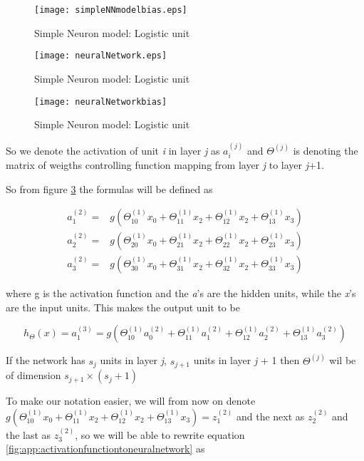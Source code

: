 \begin{figure}[H]
  \centering
  \texttt{[image: simpleNNmodelbias.eps]}
  \caption{Simple Neuron model: Logistic unit}\label{fig:app:simpleNNmodelbias}
\end{figure}

\begin{figure}[H]
  \centering
  \texttt{[image: neuralNetwork.eps]}
  \caption{Simple Neuron model: Logistic unit}\label{fig:app:neuralNetwork}
\end{figure}

\begin{figure}[H]
  \centering
  \texttt{[image: neuralNetworkbias]}
  \caption{Simple Neuron model: Logistic unit}\label{fig:app:neuralNetworkbias}
\end{figure}

So we denote the activation of unit \textit{i} in layer \textit{j} as $a_i^{(j)}$ and $\Theta^{(j)}$ is denoting the matrix of weigths controlling function mapping from layer \textit{j} to layer \textit{j}+1.

So from figure \ref{fig:app:neuralNetworkbias} the formulas will be defined as

\begin{align}\label{fig:app:activationfunctiontoneuralnetwork}
    a^{(2)}_1 =& g(\Theta^{(1)}_{10}x_0 + \Theta^{(1)}_{11}x_2 + \Theta^{(1)}_{12}x_2 + \Theta^{(1)}_{13}x_3) \\
    a^{(2)}_2 =& g(\Theta^{(1)}_{20}x_0 + \Theta^{(1)}_{21}x_2 + \Theta^{(1)}_{22}x_2 + \Theta^{(1)}_{23}x_3) \\
    a^{(2)}_3 =& g(\Theta^{(1)}_{30}x_0 + \Theta^{(1)}_{31}x_2 + \Theta^{(1)}_{32}x_2 + \Theta^{(1)}_{33}x_3)
\end{align}

where g is the activation function and the \textit{a}'s are the hidden units, while the \textit{x}'s are the input units. This makes the output unit to be

\begin{equation}
  h_\Theta(x) = a_1^{(3)} = g(\Theta^{(1)}_{10}a^{(2)}_0 + \Theta^{(1)}_{11}a^{(2)}_1 + \Theta^{(1)}_{12}a^{(2)}_2 + \Theta^{(1)}_{13}a^{(2)}_3)
\end{equation}

If the network has $s_j$ units in layer \textit{j}, $s_{j+1}$ units in layer \textit{j} + 1 then $\Theta^{(j)}$ wil be of dimension $s_{j+1} \times (s_j + 1)$

To make our notation easier, we will from now on denote $g(\Theta^{(1)}_{10}x_0 + \Theta^{(1)}_{11}x_2 + \Theta^{(1)}_{12}x_2 + \Theta^{(1)}_{13}x_3) = z_1^{(2)}$ and the next as $z_2^{(2)}$ and the last as $z_3^{(2)}$, so we will be able to rewrite equation \ref{fig:app:activationfunctiontoneuralnetwork} as

